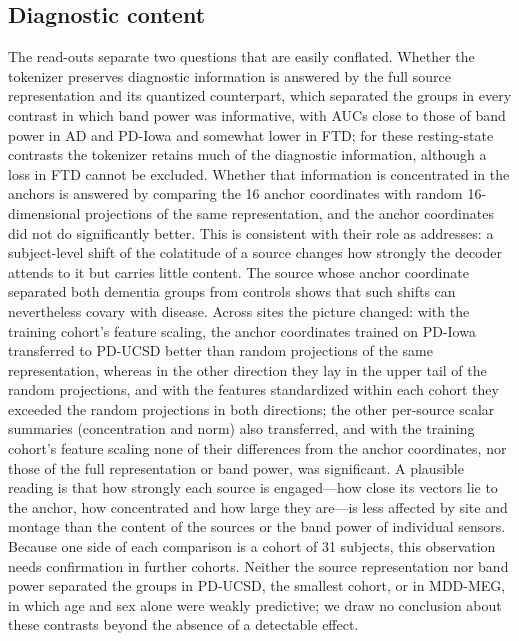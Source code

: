 \documentclass[10pt,letterpaper]{article}
\begin{document}
\subsection*{Diagnostic content}

The read-outs separate two questions that are easily conflated. Whether the tokenizer preserves
diagnostic information is answered by the full source representation and its quantized
counterpart, which separated the groups in every contrast in which band power was informative,
with AUCs close to those of band power in AD and PD-Iowa and somewhat lower in FTD; for these
resting-state contrasts the tokenizer retains much of the diagnostic information, although a loss
in FTD cannot be excluded. Whether that information is
concentrated in the anchors is answered by comparing the 16 anchor coordinates with random
16-dimensional projections of the same representation, and the anchor coordinates did not do
significantly better.
This is consistent with their role as addresses: a subject-level shift of the colatitude of a
source changes how strongly the decoder attends to it but carries little content. The source
whose anchor coordinate separated both dementia groups from controls shows that such shifts can
nevertheless covary with disease. Across sites the picture changed: with the training cohort's feature
scaling, the anchor coordinates trained on PD-Iowa transferred to PD-UCSD better than random
projections of the same representation, whereas in the other direction they lay in the upper tail of
the random projections, and with the features standardized within each cohort they exceeded the
random projections in both directions;
the other per-source scalar summaries (concentration and norm) also transferred, and with the
training cohort's feature scaling none of their differences from the anchor coordinates, nor those of
the full representation or band power, was significant. A plausible reading is that how strongly each
source is engaged---how close its vectors lie to the anchor, how concentrated and how large they
are---is less affected by site and montage than the content of the sources or the band power of
individual sensors. Because one side of each comparison is a cohort of 31 subjects, this
observation needs confirmation in further cohorts. Neither the source representation nor
band power separated the groups in PD-UCSD, the smallest cohort, or in MDD-MEG, in which age and
sex alone were weakly predictive; we draw no conclusion about these contrasts beyond the absence
of a detectable effect.
\end{document}
